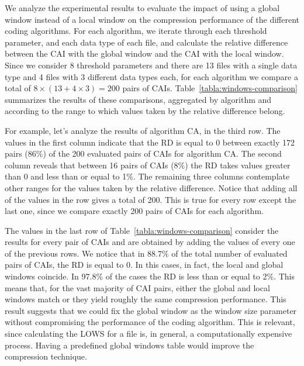 \clearpage


\clearpage


We analyze the experimental results to evaluate the impact of using a global window instead of a local window on the compression performance of the different coding algorithms. For each algorithm, we iterate through each threshold parameter, and each data type of each file, and calculate the relative difference between the CAI with the global window and the CAI with the local window. Since we consider 8 threshold parameters and there are 13 files with a single data type and 4 files with 3 different data types each, for each algorithm we compare a total of $8 \times (13 + 4\times3) = 200$ pairs of CAIs. Table~\ref{tabla:windows-comparison} summarizes the results of these comparisons, aggregated by algorithm and according to the range to which values taken by the relative difference belong. 


\vspace{+5pt}

\vspace{-5pt}


For example, let's analyze the results of algorithm CA, in the third row. The values in the first column indicate that the RD is equal to 0 between exactly 172 pairs (86\%) of the 200 evaluated pairs of CAIs for algorithm CA. The second column reveals that between 16 pairs of CAIs (8\%) the RD takes values greater than 0 and less than or equal to 1\%. The remaining three columns contemplate other ranges for the values taken by the relative difference. Notice that adding all of the values in the row gives a total of 200. This is true for every row except the last one, since we compare exactly 200 pairs of CAIs for each algorithm.


The values in the last row of Table~\ref{tabla:windows-comparison} consider the results for every pair of CAIs and are obtained by adding the values of every one of the previous rows. We notice that in 88.7\% of the total number of evaluated pairs of CAIs, the RD is equal to 0. In this cases, in fact, the local and global windows coincide. In 97.8\% of the cases the RD is less than or equal to 2\%. This means that, for the vast majority of CAI pairs, either the global and local windows match or they yield roughly the same compression performance. This result suggests that we could fix the global window as the window size parameter without compromising the performance of the coding algorithm. This is relevant, since calculating the LOWS for a file is, in general, a computationally expensive process. Having a predefined global windows table would improve the compression technique.


